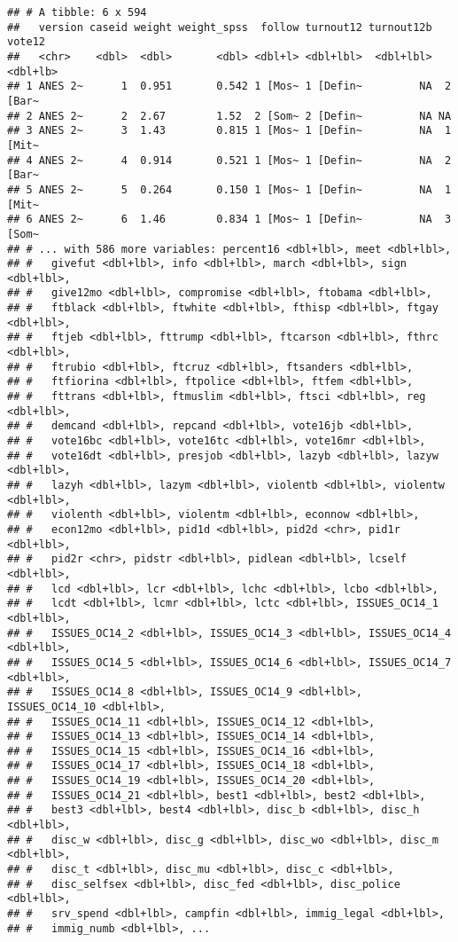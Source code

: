 \documentclass[
]{article}
\begin{document}
\begin{verbatim}
## # A tibble: 6 x 594
##   version caseid weight weight_spss  follow turnout12 turnout12b   vote12
##   <chr>    <dbl>  <dbl>       <dbl> <dbl+l> <dbl+lbl>  <dbl+lbl> <dbl+lb>
## 1 ANES 2~      1  0.951       0.542 1 [Mos~ 1 [Defin~         NA  2 [Bar~
## 2 ANES 2~      2  2.67        1.52  2 [Som~ 2 [Defin~         NA NA      
## 3 ANES 2~      3  1.43        0.815 1 [Mos~ 1 [Defin~         NA  1 [Mit~
## 4 ANES 2~      4  0.914       0.521 1 [Mos~ 1 [Defin~         NA  2 [Bar~
## 5 ANES 2~      5  0.264       0.150 1 [Mos~ 1 [Defin~         NA  1 [Mit~
## 6 ANES 2~      6  1.46        0.834 1 [Mos~ 1 [Defin~         NA  3 [Som~
## # ... with 586 more variables: percent16 <dbl+lbl>, meet <dbl+lbl>,
## #   givefut <dbl+lbl>, info <dbl+lbl>, march <dbl+lbl>, sign <dbl+lbl>,
## #   give12mo <dbl+lbl>, compromise <dbl+lbl>, ftobama <dbl+lbl>,
## #   ftblack <dbl+lbl>, ftwhite <dbl+lbl>, fthisp <dbl+lbl>, ftgay <dbl+lbl>,
## #   ftjeb <dbl+lbl>, fttrump <dbl+lbl>, ftcarson <dbl+lbl>, fthrc <dbl+lbl>,
## #   ftrubio <dbl+lbl>, ftcruz <dbl+lbl>, ftsanders <dbl+lbl>,
## #   ftfiorina <dbl+lbl>, ftpolice <dbl+lbl>, ftfem <dbl+lbl>,
## #   fttrans <dbl+lbl>, ftmuslim <dbl+lbl>, ftsci <dbl+lbl>, reg <dbl+lbl>,
## #   demcand <dbl+lbl>, repcand <dbl+lbl>, vote16jb <dbl+lbl>,
## #   vote16bc <dbl+lbl>, vote16tc <dbl+lbl>, vote16mr <dbl+lbl>,
## #   vote16dt <dbl+lbl>, presjob <dbl+lbl>, lazyb <dbl+lbl>, lazyw <dbl+lbl>,
## #   lazyh <dbl+lbl>, lazym <dbl+lbl>, violentb <dbl+lbl>, violentw <dbl+lbl>,
## #   violenth <dbl+lbl>, violentm <dbl+lbl>, econnow <dbl+lbl>,
## #   econ12mo <dbl+lbl>, pid1d <dbl+lbl>, pid2d <chr>, pid1r <dbl+lbl>,
## #   pid2r <chr>, pidstr <dbl+lbl>, pidlean <dbl+lbl>, lcself <dbl+lbl>,
## #   lcd <dbl+lbl>, lcr <dbl+lbl>, lchc <dbl+lbl>, lcbo <dbl+lbl>,
## #   lcdt <dbl+lbl>, lcmr <dbl+lbl>, lctc <dbl+lbl>, ISSUES_OC14_1 <dbl+lbl>,
## #   ISSUES_OC14_2 <dbl+lbl>, ISSUES_OC14_3 <dbl+lbl>, ISSUES_OC14_4 <dbl+lbl>,
## #   ISSUES_OC14_5 <dbl+lbl>, ISSUES_OC14_6 <dbl+lbl>, ISSUES_OC14_7 <dbl+lbl>,
## #   ISSUES_OC14_8 <dbl+lbl>, ISSUES_OC14_9 <dbl+lbl>, ISSUES_OC14_10 <dbl+lbl>,
## #   ISSUES_OC14_11 <dbl+lbl>, ISSUES_OC14_12 <dbl+lbl>,
## #   ISSUES_OC14_13 <dbl+lbl>, ISSUES_OC14_14 <dbl+lbl>,
## #   ISSUES_OC14_15 <dbl+lbl>, ISSUES_OC14_16 <dbl+lbl>,
## #   ISSUES_OC14_17 <dbl+lbl>, ISSUES_OC14_18 <dbl+lbl>,
## #   ISSUES_OC14_19 <dbl+lbl>, ISSUES_OC14_20 <dbl+lbl>,
## #   ISSUES_OC14_21 <dbl+lbl>, best1 <dbl+lbl>, best2 <dbl+lbl>,
## #   best3 <dbl+lbl>, best4 <dbl+lbl>, disc_b <dbl+lbl>, disc_h <dbl+lbl>,
## #   disc_w <dbl+lbl>, disc_g <dbl+lbl>, disc_wo <dbl+lbl>, disc_m <dbl+lbl>,
## #   disc_t <dbl+lbl>, disc_mu <dbl+lbl>, disc_c <dbl+lbl>,
## #   disc_selfsex <dbl+lbl>, disc_fed <dbl+lbl>, disc_police <dbl+lbl>,
## #   srv_spend <dbl+lbl>, campfin <dbl+lbl>, immig_legal <dbl+lbl>,
## #   immig_numb <dbl+lbl>, ...
\end{verbatim}
\end{document}
